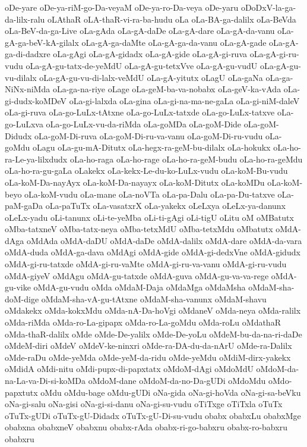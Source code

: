 {oDe-yare
oDe-ya-riM-go-Da-veyaM
oDe-ya-ro-Da-veya
oDe-yaru
oDoDxV-la-ga-da-lilx-ralu
oLAthaR
oLA-thaR-vi-ra-ba-hudu
oLa
oLa-BA-ga-dalilx
oLa-BeVda
oLa-BeV-da-ga-Live
oLa-gAda
oLa-gA-daDe
oLa-gA-dare
oLa-gA-da-vanu
oLa-gA-ga-beV-kA-gilalx
oLa-gA-ga-daMte
oLa-gA-ga-da-vanu
oLa-gA-gade
oLa-gA-ga-di-dadxre
oLa-gAgi
oLa-gA-gidadx
oLa-gA-gide
oLa-gA-gi-ruva
oLa-gA-gi-ru-vudu
oLa-gA-gu-tatx-de-yeMdU
oLa-gA-gu-tetxVve
oLa-gA-gu-vudU
oLa-gA-gu-vu-dilalx
oLa-gA-gu-vu-di-lalx-veMdU
oLa-gA-yitutx
oLagU
oLa-gaNa
oLa-ga-NiNx-niMda
oLa-ga-na-riye
oLage
oLa-geM-ba-va-nobabx
oLa-geV-ka-vAda
oLa-gi-dudx-koMDeV
oLa-gi-lalxda
oLa-gina
oLa-gi-na-ma-ne-gaLa
oLa-gi-niM-daleV
oLa-gi-ruva
oLa-go-LuLx-tAtxne
oLa-go-LuLx-tatxde
oLa-go-LuLx-tatxve
oLa-go-LuLxva
oLa-go-LuLx-vu-da-riMda
oLa-goMDa
oLa-goM-Dide
oLa-goM-Didudx
oLa-goM-Di-ruva
oLa-goM-Di-ru-va-vanu
oLa-goM-Di-ru-vudu
oLa-goMdu
oLagu
oLa-gu-mA-Ditutx
oLa-hegx-ra-geM-bu-dilalx
oLa-hokukx
oLa-ho-ra-Le-ya-lilxdudx
oLa-ho-raga
oLa-ho-rage
oLa-ho-ra-geM-budu
oLa-ho-ra-geMdu
oLa-ho-ra-gu-gaLa
oLakekx
oLa-kekx-Le-du-ko-LuLx-vudu
oLa-koM-Bu-vudu
oLa-koM-Da-nayAyx
oLa-koM-Da-nayayx
oLa-koM-Ditutx
oLa-koMDu
oLa-koM-beyo
oLa-koM-vudu
oLa-mane
oLa-noVTa
oLa-pa-Dalu
oLa-pa-Du-tatxve
oLa-paM-gaDa
oLa-paTuTx
oLa-vasatxrX
oLa-yakekx
oLeLxya
oLeLx-ya-danunx
oLeLx-yadu
oLi-tanunx
oLi-te-yeMba
oLi-ti-gAgi
oLi-tigU
oLitu
oM
oMBatutx
oMba-tatxneV
oMba-tatx-neya
oMba-tetxMdU
oMba-tetxMdu
oMbatutx
oMdA-dAga
oMdAda
oMdA-daDU
oMdA-daDe
oMdA-dalilx
oMdA-dare
oMdA-da-vara
oMdA-duda
oMdA-ga-dava
oMdAgi
oMdA-gide
oMdA-gi-dedxVne
oMdA-gidudx
oMdA-gi-ru-tatxde
oMdA-gi-ru-vaMte
oMdA-gi-ru-va-vanu
oMdA-gi-ru-vudu
oMdA-giyeV
oMdAgu
oMdA-gu-tatxde
oMdA-guva
oMdA-gu-va-va-rege
oMdA-gu-vike
oMdA-gu-vudu
oMda
oMdaM-Daja
oMdaMga
oMdaMsha
oMdaM-sha-doM-dige
oMdaM-sha-vA-gu-tAtxne
oMdaM-sha-vanunx
oMdaM-shavu
oMdakekx
oMda-kokxMdu
oMda-nA-Da-hoVgi
oMdaneV
oMda-neya
oMda-ralilx
oMda-riMda
oMda-ro-La-gipapx
oMda-ro-La-goMdu
oMda-roLu
oMdathaR
oMda-thaR-dalilx
oMde
oMde-De-yalilx
oMde-De-yoLu
oMdeM-bu-da-na-ri-daDe
oMdeM-diri
oMdeV
oMdeV-ke-ninxri
oMde-ra-DA-du-da-nArU
oMde-ra-Dalilx
oMde-raDu
oMde-yeMda
oMde-yeM-da-ridu
oMde-yeMdu
oMdiM-dirx-yakekx
oMdidA
oMdi-nitu
oMdi-pupx-di-papxtatx
oMdoM-dAgi
oMdoMdU
oMdoM-da-na-La-va-Di-si-koMDa
oMdoM-dane
oMdoM-da-no-Da-gUDi
oMdoMdu
oMdo-papxtutx
oMdu
oMdu-bage
oMdu-gUDi
oNa-gida
oNa-gi-hoVda
oNa-gi-sa-beVku
oNa-gi-salu
oNa-gisi
oNa-gi-si-danu
oNa-gi-su-vudu
oTiTxge
oTiTxla
oTuTx
oTuTx-gUDi
oTuTx-gU-Didadx
oTuTx-gU-Di-su-vudu
obabx
obabxLu
obabxMge
obabxna
obabxneV
obabxnu
obabx-rAda
obabx-ri-go-babxru
obabx-ro-babxru
obabxru
}
